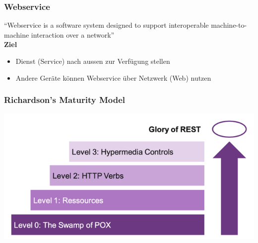 \documentclass[a4paper, landscape, 8pt]{scrartcl}
\begin{document}
\begin{multicols*}{4}
        \subsubsection{Webservice}
        \enquote{Webservice is a software system designed to support interoperable machine-to-machine interaction over a network} \\
        \textbf{Ziel}
        \begin{itemize}
            \item Dienst (Service) nach aussen zur Verfügung stellen
            \item Andere Geräte können Webservice über Netzwerk (Web) nutzen
        \end{itemize}

        \subsubsection{Richardson's Maturity Model}
        \includegraphics[scale=0.25]{graphic/25-richardsons-maturity-model}
        

\end{multicols*}
\end{document}
